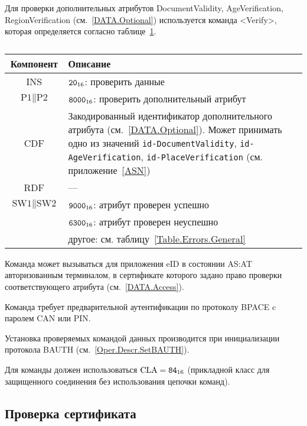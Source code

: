 Для проверки дополнительных 
атрибутов DocumentValidity, AgeVerification, RegionVerification 
(см.~\ref{DATA.Optional}) 
используется команда  <Verify>, 
которая определяется согласно 
таблице~\ref{Table.Oper.VerifyDataCmd}.

\begin{table}[hbt]
\caption{}\label{Table.Oper.VerifyDataCmd}
\begin{tabular}{|c|p{14cm}|}
\hline
Компонент & Описание \\
\hline
\hline
INS & $\texttt{20}_{16}$: проверить данные\\
\hline
$\text{P1} \parallel \text{P2}$ & $\texttt{8000}_{16}$: 
проверить дополнительный атрибут\\
\hline
CDF & Закодированный идентификатор дополнительного атрибута 
(см.~\ref{DATA.Optional}). 
Может принимать одно из значений 
\verb|id-DocumentValidity|, \verb|id-AgeVerification|, \verb|id-PlaceVerification| 
(см. приложение~\ref{ASN})\\
\hline 
RDF &  --- \\
\hline
$\text{SW1} \parallel \text{SW2}$ & $\texttt{9000}_{16}$: атрибут проверен успешно\\
 & $\texttt{6300}_{16}$: атрибут проверен неуспешно\\
 & другое: см. таблицу~\ref{Table.Errors.General} \\
\hline
\end{tabular}
\end{table}

Команда может вызываться для приложения eID в состоянии AS:AT
авторизованным терминалом, в сертификате которого задано право
проверки соответствующего атрибута (см.~\ref{DATA.Access}).  

Команда требует предварительной аутентификации по протоколу BPACE 
c паролем CAN или PIN.

Установка проверяемых командой данных производится 
при инициализации протокола BAUTH (см.~\ref{Oper.Descr.SetBAUTH}).  

Для команды должен использоваться $\text{CLA}=\texttt{84}_{16}$ 
(прикладной класс для защищенного соединения без использования цепочки 
команд). 




\subsection{Проверка сертификата}
\label{Oper.Descr.VerifyCert}

